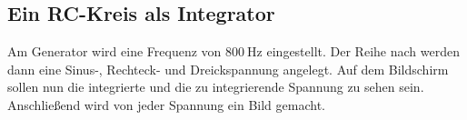 \subsection{Ein RC-Kreis als Integrator} %
\label{sub:Integrator_durch}
Am Generator wird eine Frequenz von $\qty{800}{\hertz}$ eingestellt.
Der Reihe nach werden dann eine Sinus-, Rechteck- und Dreickspannung angelegt.
Auf dem Bildschirm sollen nun die integrierte und die zu integrierende Spannung zu sehen sein.
Anschließend wird von jeder Spannung ein Bild gemacht.

